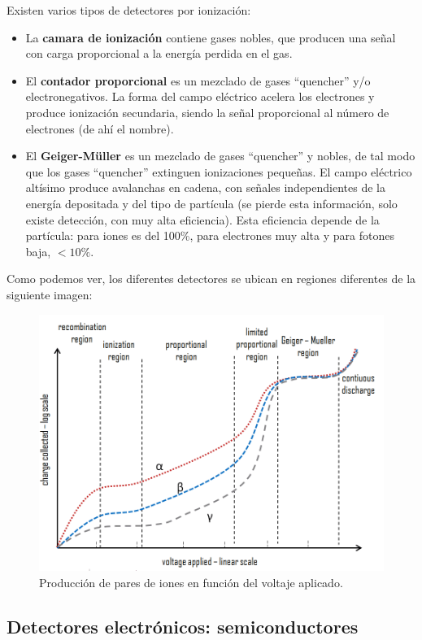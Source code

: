 Existen varios tipos de detectores por ionización: 

\begin{itemize}
    \item La \textbf{camara de ionización} contiene gases nobles, que producen una señal con carga proporcional a la energía perdida en el gas. 
    \item El \textbf{contador proporcional} es un mezclado de gases ``quencher'' y/o electronegativos. La forma del campo eléctrico acelera los electrones y produce ionización secundaria, siendo la señal proporcional al número de electrones (de ahí el nombre). 
    \item El \textbf{Geiger-Müller} es un mezclado de gases ``quencher'' y nobles, de tal modo que los gases ``quencher'' extinguen ionizaciones pequeñas. El campo eléctrico altísimo produce avalanchas en cadena, con señales independientes de la energía depositada y del tipo de partícula (se pierde esta información, solo existe detección, con muy alta eficiencia). Esta eficiencia depende de la partícula: para iones es del 100\%, para electrones muy alta y para fotones baja, $<10\%$. 
\end{itemize}
Como podemos ver, los diferentes detectores se ubican en regiones  diferentes de la siguiente imagen: 

\begin{figure}[H] \centering
    \caption{Producción de pares de iones en función del voltaje aplicado.}
    \includegraphics[width=0.7\linewidth]{Cuerpo/Ch_01/Detectores_03.png}
\end{figure}


\subsection{Detectores electrónicos: semiconductores}

